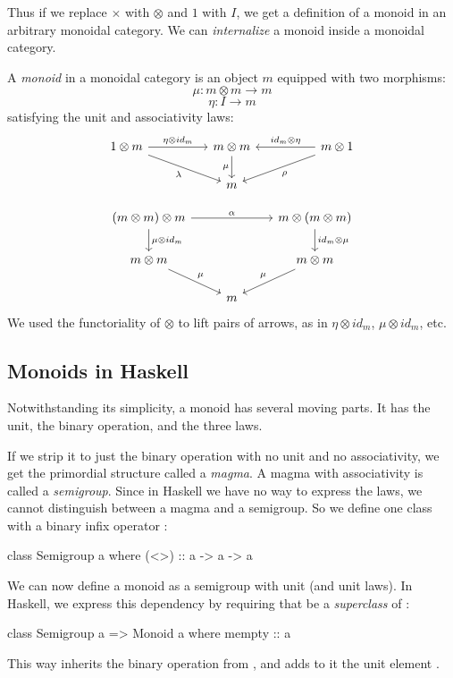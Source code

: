\documentclass[DaoFP]{subfiles}
\begin{document}
Thus if we replace $\times$ with $\otimes$ and $1$ with $I$, we get a definition of a monoid in an arbitrary monoidal category. We can \emph{internalize} a monoid inside a monoidal category.

A \emph{monoid} in a monoidal category is an object $m$ equipped with two morphisms:
\[ \mu \colon m \otimes m \to m \]
\[ \eta \colon I \to m \]
satisfying the unit and associativity laws:
\[
 \begin{tikzcd}
 1 \otimes m
 \arrow[rr, "\eta \otimes id_m"]
 \arrow[rrd, "\lambda"']
& & m \otimes m
 \arrow[d, "\mu"']
&& m \otimes 1
 \arrow[ll, "id_m \otimes \eta"']
 \arrow[lld, "\rho"]
 \\
 && m
  \end{tikzcd}
\]

\[
 \begin{tikzcd}
 (m \otimes m) \otimes m 
 \arrow[rr, "\alpha"]
 \arrow[d, "\mu \otimes id_m"]
 &&
 m \otimes (m \otimes m)
 \arrow[d, "id_m \otimes \mu"]
 \\
 m \otimes m 
 \arrow[dr, "\mu"]
& & m \otimes m
 \arrow[dl, "\mu"']
 \\
&  m
 \end{tikzcd}
\]
We used the functoriality of $\otimes$ to lift pairs of arrows, as in $\eta \otimes id_m$, $\mu \otimes id_m$, etc.

\subsection{Monoids in Haskell}

Notwithstanding its simplicity, a monoid has several moving parts. It has the unit, the binary operation, and the three laws. 

If we strip it to just the binary operation with no unit and no associativity, we get the primordial structure called a \emph{magma}. A magma with associativity is called a \emph{semigroup}. Since in Haskell we have no way to express the laws, we cannot distinguish between a magma and a semigroup. So we define one class with a binary infix operator \hask{<>}:
\begin{haskell}
class Semigroup a where
    (<>) :: a -> a -> a
\end{haskell}

We can now define a monoid as a semigroup with unit (and unit laws). In Haskell, we express this dependency by requiring that  be a \emph{superclass} of :
\begin{haskell}
class Semigroup a => Monoid a where
    mempty :: a
\end{haskell}
This way  inherits the binary operation \hask{<>} from , and adds to it the unit element .
\end{document}
